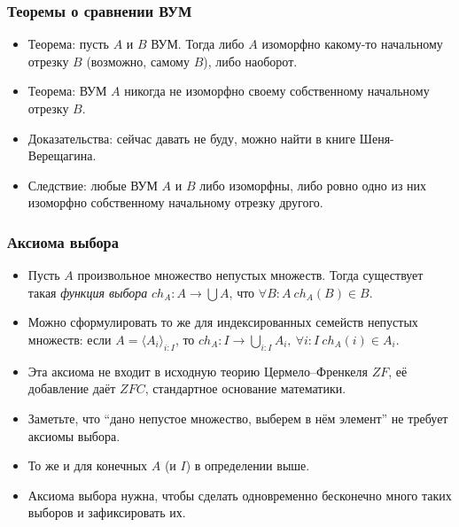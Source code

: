 \documentclass[10pt]{beamer}
\begin{document}
\begin{frame}
    \frametitle{Теоремы о сравнении ВУМ}
    \begin{itemize}
        \item Теорема: пусть $A$ и $B$ ВУМ. Тогда либо $A$ изоморфно какому-то начальному отрезку $B$ (возможно, самому $B$), либо наоборот.
        \item Теорема: ВУМ $A$ никогда не изоморфно своему собственному начальному отрезку $B$.
        \item Доказательства: сейчас давать не буду, можно найти в книге Шеня-Верещагина.
        \item Следствие: любые ВУМ $A$ и $B$ либо изоморфны, либо ровно одно из них изоморфно собственному начальному отрезку другого.
    \end{itemize}
\end{frame}

\begin{frame}
    \frametitle{Аксиома выбора}
    \begin{itemize}
        \item Пусть $A$ произвольное множество непустых множеств. Тогда существует такая \emph{функция выбора} $ch_A: A \to \bigcup A$, что $\forall B:A~ch_A(B) \in B$.
        \item Можно сформулировать то же для индексированных семейств непустых множеств: если $A = \langle A_i \rangle_{i : I}$, то $ch_A: I \to \bigcup_{i : I} A_i,~\forall i:I~ch_A(i) \in A_i$.
        \item Эта аксиома не входит в исходную теорию Цермело--Френкеля $ZF$, её добавление даёт $ZFC$, стандартное основание математики.
        \item Заметьте, что \enquote{дано непустое множество, выберем в нём элемент} не требует аксиомы выбора.
        \item То же и для конечных $A$ (и $I$) в определении выше.
        \item Аксиома выбора нужна, чтобы сделать одновременно бесконечно много таких выборов и зафиксировать их.
    \end{itemize}
\end{frame}
\end{document}
